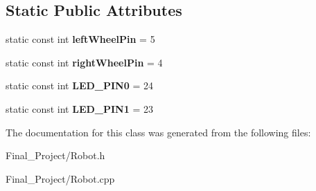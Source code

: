 \subsection*{Static Public Attributes}
\begin{DoxyCompactItemize}
\item 
\hypertarget{classRobot_a46298d7fb4c8c3932221c6a5ac14af9d}{static const int {\bfseries left\-Wheel\-Pin} = 5}\label{classRobot_a46298d7fb4c8c3932221c6a5ac14af9d}

\item 
\hypertarget{classRobot_a572525b971da4e0f272f5f1259f6c84f}{static const int {\bfseries right\-Wheel\-Pin} = 4}\label{classRobot_a572525b971da4e0f272f5f1259f6c84f}

\item 
\hypertarget{classRobot_a431ea8916b52ddfddbe6d80a09fe71e0}{static const int {\bfseries L\-E\-D\-\_\-\-P\-I\-N0} = 24}\label{classRobot_a431ea8916b52ddfddbe6d80a09fe71e0}

\item 
\hypertarget{classRobot_a4c6f4e38b77bf470d757ebea1b8c3cf0}{static const int {\bfseries L\-E\-D\-\_\-\-P\-I\-N1} = 23}\label{classRobot_a4c6f4e38b77bf470d757ebea1b8c3cf0}

\end{DoxyCompactItemize}


The documentation for this class was generated from the following files\-:\begin{DoxyCompactItemize}
\item 
Final\-\_\-\-Project/Robot.\-h\item 
Final\-\_\-\-Project/Robot.\-cpp\end{DoxyCompactItemize}
